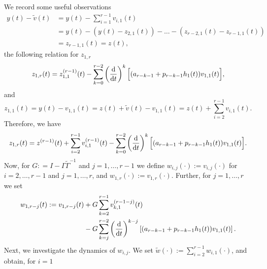 \documentclass[ envcountsect, envcountsame]{svjour3}
\begin{document}
We record some useful observations
\begin{equation*}
\begin{aligned}
y(t) - \tilde v(t) &= y(t) - \sum_{i=1}^{r-1} v_{i,1}(t) \\
&= y(t) - (y(t) - z_{2,1}(t)) - \ldots - (z_{r-2,1}(t) - z_{r-1,1}(t)) \\
& = z_{r-1,1}(t) = z(t),
\end{aligned}
\end{equation*}
the following relation for $z_{1,r}$
\begin{equation*}
z_{1,r}(t) = z_{1,1}^{(r-1)}(t) - \sum_{k=0}^{r-2} \left( \frac{\text{\normalfont{d}}}{\text{\normalfont{d}} t} \right)^k \Big[ ( a_{r-k-1} + p_{r-k-1} h_{1}(t)) v_{1,1}(t) \Big],
\end{equation*}
and
\begin{equation*}
z_{1,1}(t) = y(t) - v_{1,1}(t) = z(t) + \tilde v(t) - v_{1,1}(t) = z(t) + \sum_{i=2}^{r-1} v_{i,1}(t).
\end{equation*}
Therefore, we have
\begin{equation*}
z_{1,r}(t) = z^{(r-1)}(t) + \sum_{i=2}^{r-1} v_{i,1}^{(r-1)}(t) 
-  \sum_{k=0}^{r-2} \left( \frac{\text{\normalfont{d}}}{\text{\normalfont{d}} t} \right)^k \Big[ ( a_{r-k-1} + p_{r-k-1} h_{1}(t)) v_{1,1}(t) \Big].
\end{equation*}
%
Now, for $G: = I - \Gamma \tilde \Gamma^{-1}$ and $j=1,\ldots,r-1$ we define $w_{i,j}(\cdot) := v_{i,j}(\cdot)$ for $i=2,\ldots,r-1$ and $j=1,\ldots,r$, 
and $w_{1,r}(\cdot) := v_{1,r}(\cdot)$. Further, for $j=1,\ldots,r$ we set
\begin{equation*}
\begin{aligned}
w_{1,r-j}(t) := v_{1,r-j}(t) &+ G  \sum_{k=2}^{r-1} v_{k,1}^{(r-1-j)}(t) \\
& -G \sum_{k=j}^{r-2} \left( \frac{\text{\normalfont{d}}}{\text{\normalfont{d}} t} \right)^{k-j} \left[ ( a_{r-k-1} + p_{r-k-1} h_{1}(t)) v_{1,1}(t) \right] .
\end{aligned}
\end{equation*}
%
Next, we investigate the dynamics of $w_{i,j}$. We set $\tilde w(\cdot) := \sum_{i=2}^{r-1} w_{i,1}(\cdot)$, and obtain, for $i=1$
\end{document}

